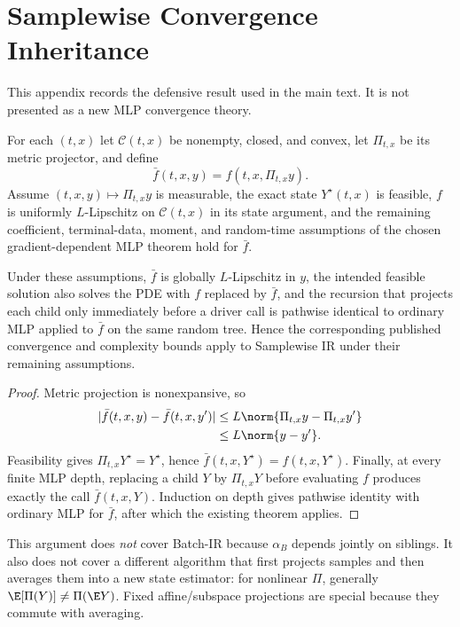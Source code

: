 \appendix

\section{Samplewise Convergence Inheritance}
\label{app:convergence}
This appendix records the defensive result used in the main text. It is not presented as a new MLP convergence theory.

For each $(t,x)$ let $\mathcal C(t,x)$ be nonempty, closed, and convex, let $\Pi_{t,x}$ be its metric projector, and define
\begin{equation}
\bar f(t,x,y)=f(t,x,\Pi_{t,x}y).
\label{eq:barf}
\end{equation}
Assume $(t,x,y)\mapsto\Pi_{t,x}y$ is measurable, the exact state $Y^\star(t,x)$ is feasible, $f$ is uniformly $L$-Lipschitz on $\mathcal C(t,x)$ in its state argument, and the remaining coefficient, terminal-data, moment, and random-time assumptions of the chosen gradient-dependent MLP theorem hold for $\bar f$.

\begin{proposition}
Under these assumptions, $\bar f$ is globally $L$-Lipschitz in $y$, the intended feasible solution also solves the PDE with $f$ replaced by $\bar f$, and the recursion that projects each child only immediately before a driver call is pathwise identical to ordinary MLP applied to $\bar f$ on the same random tree. Hence the corresponding published convergence and complexity bounds apply to Samplewise IR under their remaining assumptions.
\end{proposition}
\begin{proof}
Metric projection is nonexpansive, so
\begin{align*}
|\bar f(t,x,y)-\bar f(t,x,y')|
&\le L\norm{\Pi_{t,x}y-\Pi_{t,x}y'}\\
&\le L\norm{y-y'}.
\end{align*}
Feasibility gives $\Pi_{t,x}Y^\star=Y^\star$, hence $\bar f(t,x,Y^\star)=f(t,x,Y^\star)$. Finally, at every finite MLP depth, replacing a child $Y$ by $\Pi_{t,x}Y$ before evaluating $f$ produces exactly the call $\bar f(t,x,Y)$. Induction on depth gives pathwise identity with ordinary MLP for $\bar f$, after which the existing theorem applies.
\end{proof}

This argument does \emph{not} cover Batch-IR because $\alpha_B$ depends jointly on siblings. It also does not cover a different algorithm that first projects samples and then averages them into a new state estimator: for nonlinear $\Pi$, generally $\E[\Pi(Y)]\neq\Pi(\E Y)$. Fixed affine/subspace projections are special because they commute with averaging.

